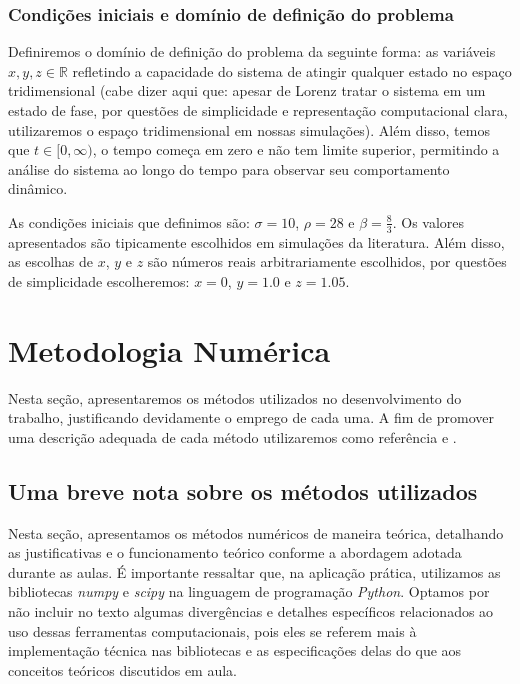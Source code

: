 \documentclass[12pt, a4paper]{article}
\begin{document}
\subsubsection{Condições iniciais e domínio de definição do problema}
\label{sec:cond-ini}
Definiremos o domínio de definição do problema da seguinte forma: as
variáveis $x,y, z \in \mathbb{R}$ refletindo a capacidade do sistema de atingir
qualquer estado no espaço tridimensional (cabe dizer aqui que: apesar de Lorenz
tratar o sistema em um estado de fase, por questões de simplicidade e
representação computacional clara, utilizaremos o espaço tridimensional em
nossas simulações). Além disso, temos que $t \in [0, \infty)$, o tempo começa
em zero e não tem limite superior, permitindo a análise do sistema ao longo do
tempo para observar seu comportamento dinâmico.

As condições iniciais que definimos são: $\sigma = 10$, $\rho = 28$ e
$\beta = \frac{8}{3}$. Os valores apresentados são tipicamente escolhidos em
simulações da literatura. Além disso, as escolhas de $x$, $y$ e $z$ são números
reais arbitrariamente escolhidos, por questões de simplicidade escolheremos: $x
    = 0$, $y=1.0$ e $z=1.05$.
\newpage


\section{Metodologia Numérica}
Nesta seção, apresentaremos os métodos utilizados no desenvolvimento do
trabalho, justificando devidamente o emprego de cada uma. A fim de promover uma
descrição adequada de cada método utilizaremos como referência \cite{roma2023}
e \cite{burden2016}.

\subsection{Uma breve nota sobre os métodos utilizados}
Nesta seção, apresentamos os métodos numéricos de maneira teórica,
detalhando as justificativas e o funcionamento teórico conforme a abordagem
adotada durante as aulas. É importante ressaltar que, na aplicação prática,
utilizamos as bibliotecas \textit{numpy} e \textit{scipy} na linguagem de
programação \textit{Python}. Optamos por não incluir no texto algumas
divergências e detalhes específicos relacionados ao uso dessas ferramentas
computacionais, pois eles se referem mais à implementação técnica nas
bibliotecas e as especificações delas do que aos conceitos teóricos discutidos
em aula.
\end{document}
